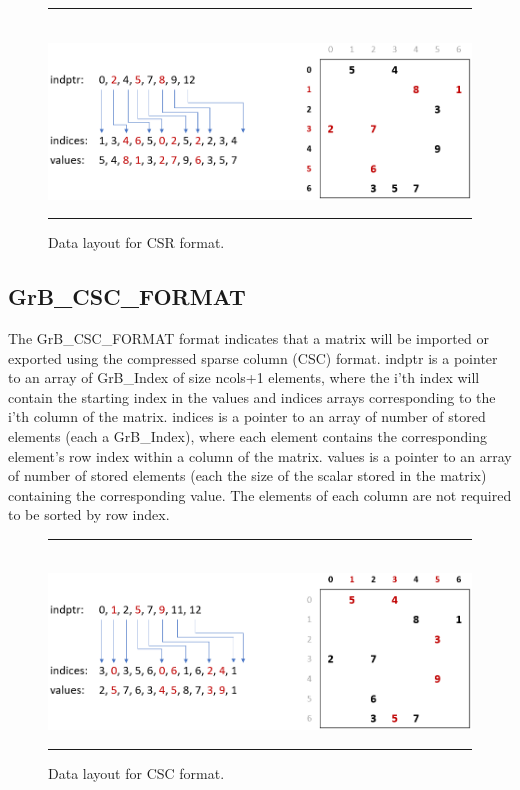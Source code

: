 \begin{figure}[h]
    \hrule
    \begin{center}
        ~\\
        \includegraphics[width=4.5in]{GrB_CSR_FORMAT.png}
    \end{center}
    \caption{Data layout for CSR format.}
    \label{Fig:CSR_format}
    \hrule
\end{figure}

\subsection{{\sf GrB\_CSC\_FORMAT}}

The {\sf GrB\_CSC\_FORMAT} format indicates that a matrix will be imported or 
exported using the compressed sparse column (CSC) format.  {\sf indptr} is a 
pointer to an array of {\sf GrB\_Index} of size ncols+1 elements, where
the i'th index will contain the starting index in the {\sf values}
and {\sf indices} arrays corresponding to the i'th column of the matrix.
{\sf indices} is a pointer to an array of number of
stored elements (each a {\sf GrB\_Index}), where each element contains the 
corresponding element's row index within a column of the matrix.
{\sf values} is a pointer to an array of number of
stored elements (each the size of the scalar stored in the matrix) containing 
the corresponding value.  The 
elements of each column are not required to be sorted by row index.

\begin{figure}[h]
    \hrule
    \begin{center}
        ~\\
        \includegraphics[width=4.5in]{GrB_CSC_FORMAT.png}
    \end{center}
    \vspace{-1em}
    \caption{Data layout for CSC format.}
    \label{Fig:CSC_format}
    \hrule
\end{figure}

